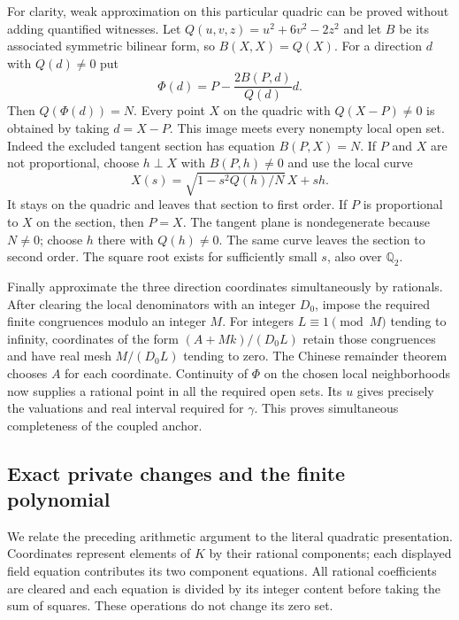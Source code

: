 For clarity, weak approximation on this particular quadric
can be proved without adding quantified witnesses.
Let $Q(u,v,z)=u^2+6v^2-2z^2$ and let $B$ be its associated
symmetric bilinear form, so $B(X,X)=Q(X)$.
For a direction $d$ with $Q(d)\ne0$ put
\[
 \Phi(d)=P-\frac{2B(P,d)}{Q(d)}d .
\]
Then $Q(\Phi(d))=N$. Every point $X$ on the quadric with
$Q(X-P)\ne0$ is obtained by taking $d=X-P$.
This image meets every nonempty local open set. Indeed the
excluded tangent section has equation $B(P,X)=N$.
If $P$ and $X$ are not proportional, choose
$h\perp X$ with $B(P,h)\ne0$ and use the local curve
\[
 X(s)=\sqrt{1-s^2Q(h)/N}\,X+sh .
\]
It stays on the quadric and leaves that section to first
order. If $P$ is proportional to $X$ on the section, then
$P=X$. The tangent plane is nondegenerate because $N\ne0$;
choose $h$ there with $Q(h)\ne0$. The same curve leaves the
section to second order. The square root exists for
sufficiently small $s$, also over $\mathbb Q_2$.

Finally approximate the three direction coordinates
simultaneously by rationals. After clearing the local
denominators with an integer $D_0$, impose the required finite
congruences modulo an integer $M$. For integers
$L\equiv1\pmod M$ tending to infinity, coordinates of the form
$(A+Mk)/(D_0L)$ retain those congruences and have real mesh
$M/(D_0L)$ tending to zero. The Chinese remainder theorem
chooses $A$ for each coordinate. Continuity of $\Phi$ on the
chosen local neighborhoods now supplies a rational point in
all the required open sets. Its $u$ gives precisely the
valuations and real interval required for $\gamma$.
This proves simultaneous completeness of the coupled anchor.

\subsection{Exact private changes and the finite polynomial}
\label{subsec:v14-finite}
We relate the preceding arithmetic argument to the literal
quadratic presentation. Coordinates represent elements of
$K$ by their rational components; each displayed field
equation contributes its two component equations.
All rational coefficients are cleared and each equation is
divided by its integer content before taking the sum of
squares. These operations do not change its zero set.

